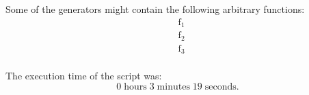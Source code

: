 \noindent Some of the generators might contain the following arbitrary functions:
\begin{align*}
&\operatorname{f_{1}}\\
&\operatorname{f_{2}}\\
&\operatorname{f_{3}}\\
\end{align*}

\noindent The execution time of the script was:
$$0\;\mathrm{hours}\;3\;\mathrm{minutes}\;19 \;\mathrm{seconds}.$$
